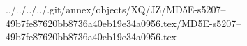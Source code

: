 ../../../../.git/annex/objects/XQ/JZ/MD5E-s5207--49b7fe87620bb8736a40eb19e34a0956.tex/MD5E-s5207--49b7fe87620bb8736a40eb19e34a0956.tex
